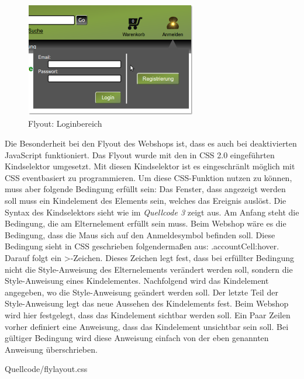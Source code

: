 \begin{figure}[H]
	\begin{center}
			\includegraphics[width=75mm]{Bilder/Abbildung14_Loginbereich.png}
	\end{center}
	\caption{Flyout: Loginbereich}
\end{figure}

Die Besonderheit bei den Flyout des Webshops ist, dass es auch bei deaktivierten JavaScript funktioniert.  Das Flyout wurde mit den in CSS 2.0 eingeführten \glqq Kindselektor\grqq{} umgesetzt. Mit diesen \glqq Kindselektor\grqq{} ist es eingeschränlt möglich mit CSS eventbasiert zu programmieren. Um diese CSS-Funktion nutzen zu können, muss aber folgende Bedingung erfüllt sein: Das Fenster, dass angezeigt werden soll muss ein Kindelement des Elements sein, welches das Ereignis auslöst. Die Syntax des \glqq Kindselektors\grqq{} sieht wie im \textit{Quellcode 3} zeigt aus. Am Anfang steht die Bedingung, die am Elternelement erfüllt sein muss. Beim Webshop wäre es die Bedingung, dass die Maus sich auf den Anmeldesymbol befinden soll. Diese Bedingung sieht in CSS geschrieben folgendermaßen aus: \glqq .accountCell:hover\grqq{}. Darauf folgt ein \glqq >\grqq{}-Zeichen. Dieses Zeichen legt fest, dass bei erfüllter Bedingung nicht die Style-Anweisung des Elternelements verändert werden soll, sondern die Style-Anweisung eines Kindelementes. Nachfolgend wird das Kindelement angegeben, wo die Style-Anweisung geändert werden soll. Der letzte Teil der Style-Anweisung legt das neue Aussehen des Kindelements fest. Beim Webshop wird hier festgelegt, dass das Kindelement sichtbar werden soll. Ein Paar Zeilen vorher definiert eine Anweisung, dass das Kindelement unsichtbar sein soll. Bei gültiger Bedingung wird diese Anweisung einfach von der eben genannten Anweisung überschrieben.

\begin{center}
	\begin{lstinputlisting}[language=CSS, caption={Loginbereich: Umsetzung des Flyouts mit CSS 2.0}]
		{Quellcode/flylayout.css}
	\end{lstinputlisting}
\end{center}

